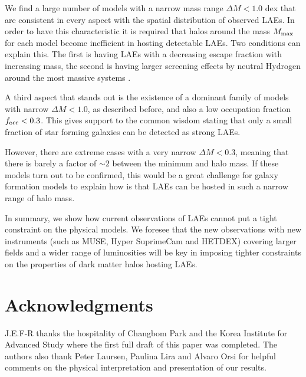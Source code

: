 \documentclass[usenatbib]{mn2e}
\newcommand{\ly}{{\ifmmode{{\rm Ly}\alpha}\else{Ly$\alpha$~}\fi}}
\begin{document}
 
We find a large number of models with a narrow mass range
$\Delta M<1.0$ dex that are consistent in every aspect with the
spatial distribution of observed LAEs. In order to have this characteristic
it is required that halos around the mass $M_{\rm   max}$ for each
model become inefficient in hosting detectable LAEs. Two conditions
can explain this. The first is having LAEs with a decreasing \ly
escape fraction with increasing mass, the second is having larger screening
effects by neutral Hydrogen around the most massive systems
\citep{Laursen2009,ForeroRomero2011}.  

A third aspect that stands out is the existence of a dominant family
of models with narrow $\Delta M<1.0$, as described before, and also a
low occupation fraction $f_{\rm occ}<0.3$. This gives support to the
common wisdom stating that only a small fraction of star forming
galaxies can be detected as strong LAEs. 

However, there are extreme cases with a very narrow $\Delta M<0.3$, meaning that
there is barely a factor of $\sim 2$ between the minimum and halo
mass. If these models turn out to be confirmed, this would be a great
challenge for galaxy formation models to explain how is that LAEs can
be hosted in such a narrow range of halo mass.

In summary, we show how current observations of LAEs cannot
put a tight constraint on the physical models. We  foresee that the
new observations with new instruments (such as MUSE, Hyper SuprimeCam
and HETDEX) covering larger fields and a wider range of luminosities
will be key in imposing tighter constraints on the properties of dark
matter halos hosting LAEs.   


\section*{Acknowledgments} 
J.E.F-R thanks the hospitality of Changbom Park and the Korea
Institute for Advanced Study where the first full draft of this paper
was completed. The authors also thank Peter Laursen, Paulina Lira and
Alvaro Orsi for helpful comments on the physical interpretation and
presentation of our results. 
\end{document}
